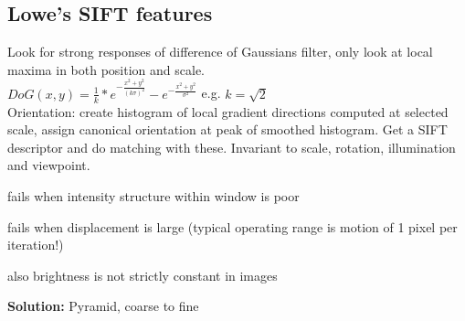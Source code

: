 \subsection*{Lowe's SIFT features}
Look for strong responses of difference of Gaussians  filter, only look at local maxima in both position and scale.\\
 $DoG(x, y) = \frac{1}{k}* e^{-\frac{x^{2} + y^{2}}{(k\sigma)^{2}}} - e^{-\frac{x^{2} + y^{2}}{\sigma^{2}}}$ e.g. $k = \sqrt{2}$\\
Orientation: create histogram of local gradient directions computed at selected scale, assign canonical orientation at peak of smoothed histogram. Get a SIFT descriptor  and do matching with these. Invariant to scale, rotation, illumination and viewpoint.
\begin{compactenum}
    \item fails when intensity structure within window is poor
    \item fails when displacement is large (typical operating range is motion of 1 pixel per iteration!)
    \item also brightness is not strictly constant in images
\end{compactenum}
\textbf{Solution:} Pyramid, coarse to fine
